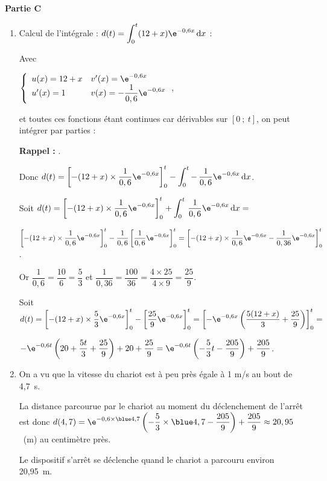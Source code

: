 \begin{center}\textbf{Partie C} \end{center}

\begin{enumerate}
\item Calcul de l'intégrale : $d(t) = \displaystyle\int_0^t (12 + x)\e^{-0,6x}\,\text{d}x$ :

Avec

$\left\{\begin{array}{l l}
u(x) = 12 + x	&v'(x) = \e^{-0,6x}\\
u'(x) = 1		&v(x) = - \dfrac{1}{0,6}\e^{-0,6x}\\
\end{array}\right.$,

et toutes ces fonctions étant continues car dérivables sur $[0~;~t]$, on peut intégrer par parties :

\textbf{Rappel :} .

Donc $d(t) = \left[-(12 + x)\times \dfrac{1}{0,6}\e^{-0,6x}\right]_0^t - \displaystyle\int_0^t -\,\dfrac{1}{0,6}\e^{-0,6x}\,\text{d}x$.

Soit $d(t) = \left[-(12 + x)\times \dfrac{1}{0,6}\e^{-0,6x} \right]_0^t + \displaystyle\int_0^t \,\dfrac{1}{0,6}\e^{-0,6x}\,\text{d}x = $

$\left[-(12 + x)\times \dfrac{1}{0,6}\e^{-0,6x} \right]_0^t - \dfrac{1}{0,6}\left[\dfrac{1}{0,6}\e^{-0,6x}\right]_0^t  = \left[-(12 + x)\times \dfrac{1}{0,6}\e^{-0,6x} - \dfrac{1}{0,36}\e^{-0,6x} \right]_0^t$.

Or $\dfrac{1}{0,6} = \dfrac{10}{6} = \dfrac 53$ et $\dfrac{1}{0,36} = \dfrac{100}{36} = \dfrac{4\times 25}{4 \times 9} = \dfrac{25}{9}$.

Soit $d(t) = \left[-(12 + x)\times \dfrac53\e^{-0,6x} \right]_0^t - \left[\dfrac{25}{9}\e^{-0,6x} \right]_0^t = \left[-\e^{-0,6x}\left(\dfrac{5(12 + x)}{3}  + \dfrac{25}{9}\right) \right]_0^t =$

$ -\e^{-0,6t}\left(20 + \dfrac{5t}{3} + \dfrac{25}{9}\right) + 20 + \dfrac{25}{9} = \e^{-0,6t}\left(- \dfrac 53 t - \dfrac{205}{9}\right) + \dfrac{205}{9}$.
\item On a vu que la vitesse du chariot est à peu près égale à 1 m/s au bout de 4,7~s.

La distance parcourue par le chariot au moment du déclenchement de l'arrêt est donc $d(4,7) = \e^{-0,6\times {\blue 4,7}}\left(- \dfrac 53 \times{\blue 4,7} - \dfrac{205}{9}\right) + \dfrac{205}{9} \approx 20,95$~(m) au centimètre près.

Le dispositif s'arrêt se déclenche quand le chariot a parcouru environ 20,95~m.

\end{enumerate}
